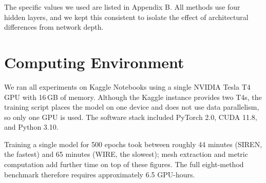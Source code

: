 The specific values we used are listed in Appendix B. All methods use four hidden layers, and we kept this consistent to isolate the effect of architectural differences from network depth.

\section{Computing Environment}

We ran all experiments on Kaggle Notebooks using a single NVIDIA Tesla T4 GPU with 16\,GB of memory. Although the Kaggle instance provides two T4s, the training script places the model on one device and does not use data parallelism, so only one GPU is used. The software stack included PyTorch 2.0, CUDA 11.8, and Python 3.10.

Training a single model for 500 epochs took between roughly 44 minutes (SIREN, the fastest) and 65 minutes (WIRE, the slowest); mesh extraction and metric computation add further time on top of these figures. The full eight-method benchmark therefore requires approximately 6.5 GPU-hours.
